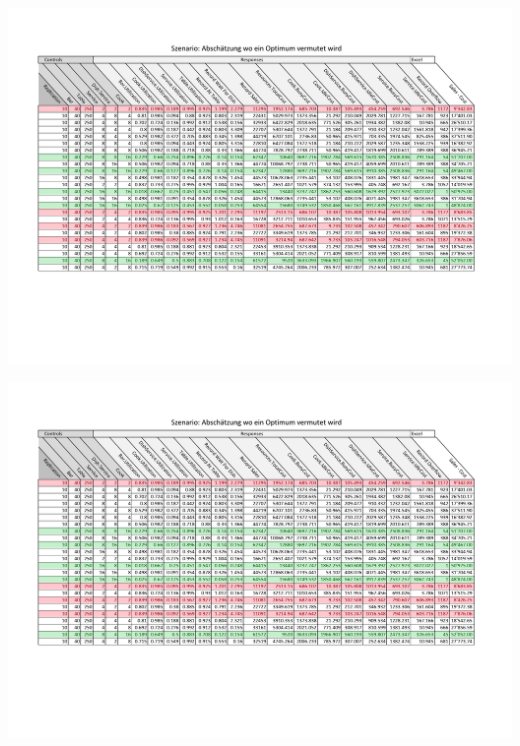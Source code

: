 \documentclass[ngerman,a4paper,12pt]{scrreprt}
\begin{document}
\begin{landscape}
\begin{center}
		\includegraphics[page=3, trim=2cm 15cm 2cm 2cm, clip=true, width=1.425\textwidth]{../Auswertung/Data.pdf}
	\end{center}
	\begin{center}
		\includegraphics[page=4, trim=2cm 5cm 2cm 2cm, clip=true, width=1.35\textwidth]{../Auswertung/Data.pdf}
	\end{center}
\end{landscape}
\end{document}
